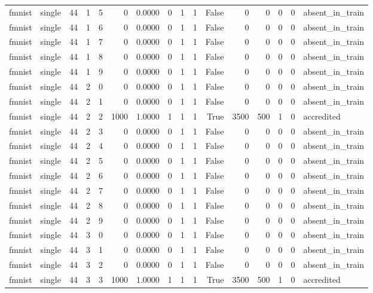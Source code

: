 \begin{tabular}{llrrrrrrrrrrrrrl}
fmnist & single & 44 & 1 & 5 & 0 & 0.0000 & 0 & 1 & 1 & False & 0 & 0 & 0 & 0 & absent\_in\_train \\
fmnist & single & 44 & 1 & 6 & 0 & 0.0000 & 0 & 1 & 1 & False & 0 & 0 & 0 & 0 & absent\_in\_train \\
fmnist & single & 44 & 1 & 7 & 0 & 0.0000 & 0 & 1 & 1 & False & 0 & 0 & 0 & 0 & absent\_in\_train \\
fmnist & single & 44 & 1 & 8 & 0 & 0.0000 & 0 & 1 & 1 & False & 0 & 0 & 0 & 0 & absent\_in\_train \\
fmnist & single & 44 & 1 & 9 & 0 & 0.0000 & 0 & 1 & 1 & False & 0 & 0 & 0 & 0 & absent\_in\_train \\
fmnist & single & 44 & 2 & 0 & 0 & 0.0000 & 0 & 1 & 1 & False & 0 & 0 & 0 & 0 & absent\_in\_train \\
fmnist & single & 44 & 2 & 1 & 0 & 0.0000 & 0 & 1 & 1 & False & 0 & 0 & 0 & 0 & absent\_in\_train \\
fmnist & single & 44 & 2 & 2 & 1000 & 1.0000 & 1 & 1 & 1 & True & 3500 & 500 & 1 & 0 & accredited \\
fmnist & single & 44 & 2 & 3 & 0 & 0.0000 & 0 & 1 & 1 & False & 0 & 0 & 0 & 0 & absent\_in\_train \\
fmnist & single & 44 & 2 & 4 & 0 & 0.0000 & 0 & 1 & 1 & False & 0 & 0 & 0 & 0 & absent\_in\_train \\
fmnist & single & 44 & 2 & 5 & 0 & 0.0000 & 0 & 1 & 1 & False & 0 & 0 & 0 & 0 & absent\_in\_train \\
fmnist & single & 44 & 2 & 6 & 0 & 0.0000 & 0 & 1 & 1 & False & 0 & 0 & 0 & 0 & absent\_in\_train \\
fmnist & single & 44 & 2 & 7 & 0 & 0.0000 & 0 & 1 & 1 & False & 0 & 0 & 0 & 0 & absent\_in\_train \\
fmnist & single & 44 & 2 & 8 & 0 & 0.0000 & 0 & 1 & 1 & False & 0 & 0 & 0 & 0 & absent\_in\_train \\
fmnist & single & 44 & 2 & 9 & 0 & 0.0000 & 0 & 1 & 1 & False & 0 & 0 & 0 & 0 & absent\_in\_train \\
fmnist & single & 44 & 3 & 0 & 0 & 0.0000 & 0 & 1 & 1 & False & 0 & 0 & 0 & 0 & absent\_in\_train \\
fmnist & single & 44 & 3 & 1 & 0 & 0.0000 & 0 & 1 & 1 & False & 0 & 0 & 0 & 0 & absent\_in\_train \\
fmnist & single & 44 & 3 & 2 & 0 & 0.0000 & 0 & 1 & 1 & False & 0 & 0 & 0 & 0 & absent\_in\_train \\
fmnist & single & 44 & 3 & 3 & 1000 & 1.0000 & 1 & 1 & 1 & True & 3500 & 500 & 1 & 0 & accredited \\

\end{tabular}
